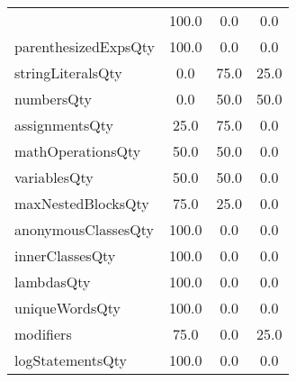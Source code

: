 \begin{tabular}{lccc}
{tryCatchQty & 100.0 & 0.0 & 0.0 \\
parenthesizedExpsQty & 100.0 & 0.0 & 0.0 \\
stringLiteralsQty & 0.0 & 75.0 & 25.0 \\
numbersQty & 0.0 & 50.0 & 50.0 \\
assignmentsQty & 25.0 & 75.0 & 0.0 \\
mathOperationsQty & 50.0 & 50.0 & 0.0 \\
variablesQty & 50.0 & 50.0 & 0.0 \\
maxNestedBlocksQty & 75.0 & 25.0 & 0.0 \\
anonymousClassesQty & 100.0 & 0.0 & 0.0 \\
innerClassesQty & 100.0 & 0.0 & 0.0 \\
lambdasQty & 100.0 & 0.0 & 0.0 \\
uniqueWordsQty & 100.0 & 0.0 & 0.0 \\
modifiers & 75.0 & 0.0 & 25.0 \\
logStatementsQty & 100.0 & 0.0 & 0.0 \\
\bottomrule
              \end{tabular}
            